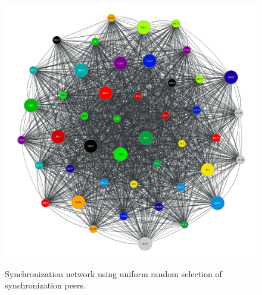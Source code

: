 \begin{figure}
    \begin{center}
        \includegraphics[width=5in]{figures/ch06_b-uniform-selection-e1.pdf}
    \end{center}
    \renewcommand{\baselinestretch}{1}
    \small\normalsize

    \begin{quote}
        \caption[Uniform Anti-Entropy Synchronization Network]{Synchronization network using uniform random selection of synchronization peers.}
        \label{fig:ch06_uniform_selection_topology}
    \end{quote}
\end{figure}
\renewcommand{\baselinestretch}{2}
\small\normalsize

